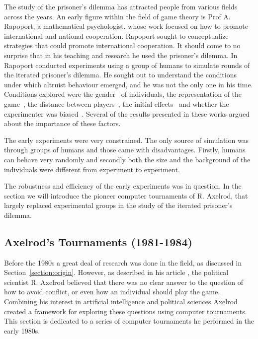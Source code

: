 \documentclass{article}
\theoremstyle{definition}
\begin{document}
The study of the prisoner's dilemma has attracted people from various fields
across the years. An early figure within the field of game theory
is Prof A. Rapoport, a mathematical psychologist, whose work focused on
how to promote international and national cooperation. Rapoport sought to conceptualize
strategies that could promote international cooperation. It should come to no surprise
that in his teaching and research he used the prisoner's dilemma.
In~\cite{rapoport1965} Rapoport conducted experiments using a group of humans
to simulate rounds of the iterated prisoner's dilemma. He sought out to understand
the conditions under which altruist behaviour emerged, and
he was not the only one in his time.
Conditions explored were the gender~\cite{Evans1966, Lutzker1961, Mack1971} of
individuals, the representation of the game~\cite{Evans1966}, the distance between
players~\cite{Sensenig1972}, the initial effects~\cite{Tedeschi1968} and whether
the experimenter was biased~\cite{Gallo1968}. Several of the results presented
in these works argued about the importance of these factors.

The early experiments were very constrained. The only source of simulation was
through groups of humans and those came with disadvantages. Firstly, humans can
behave very randomly and secondly both the size and the background of the
individuals were different from experiment to experiment.

The robustness and efficiency of the early experiments was in question. In the
section we will introduce the pioneer computer tournaments of R. Axelrod, that
largely replaced experimental groups in the study of the iterated prisoner's dilemma.

\subsection{Axelrod's Tournaments (1981-1984)}\label{subsection:axelrods_tournament}

Before the 1980s a great deal of research was done in the field, as discussed
in Section~\ref{section:origin}. However, as described in his article
\cite{Axelrod2012}, the political scientist R. Axelrod believed
that there was no clear answer to the question of how to avoid conflict, or even
how an individual should play the game. Combining his interest in artificial
intelligence and political sciences Axelrod created a framework for exploring these
questions using computer tournaments. This section is dedicated to a series of
computer tournaments he performed in the early 1980s.
\end{document}
